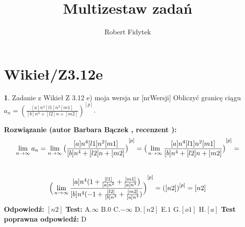 \documentclass[12pt, a4paper]{article}
\title{Multizestaw zadań}
\author{Robert Fidytek}
\date{}
\theoremstyle{definition} %
\newtheorem{zad}{}
\newcommand{\kategoria}[1]{\section{#1}} %
\newcommand{\zadStart}[1]{\begin{zad}#1\newline} %
\newcommand{\zadStop}{\end{zad}}   %
\newcommand{\rozwStart}[2]{\noindent \textbf{Rozwiązanie (autor #1 , recenzent #2): }\newline} %
\newcommand{\rozwStop}{\newline}                                            %
\newcommand{\odpStart}{\noindent \textbf{Odpowiedź:}\newline}    %
\newcommand{\odpStop}{\newline}                                             %
\newcommand{\testStart}{\noindent \textbf{Test:}\newline} %
\newcommand{\testStop}{\newline} %
\newcommand{\kluczStart}{\noindent \textbf{Test poprawna odpowiedź:}\newline} %
\newcommand{\kluczStop}{\newline} %
\begin{document}
\maketitle


\kategoria{Wikieł/Z3.12e}
\zadStart{Zadanie z Wikieł Z 3.12 e) moja wersja nr [nrWersji]}
Obliczyć granicę ciągu $a_n={(\frac{[a]n^4 [l1]n^2 [m1]}{[b]n^4 + [l2]n +[m2]})}^{[p]}$.
\zadStop
\rozwStart{Barbara Bączek}{}
$$\lim_{n \rightarrow \infty} a_n= \lim_{n \rightarrow \infty} {\big{(}\frac{[a]n^4 [l1]n^2 [m1]}{[b]n^4 + [l2]n +[m2]}\big{)}}^{[p]} = {\big{(}\lim_{n \rightarrow \infty} \frac{[a]n^4 [l1]n^2 [m1]}{[b]n^4 + [l2]n +[m2]}\big{)}}^{[p]}= $$\\ 
$${\Big{(}\lim_{n \rightarrow \infty} \frac{[a]n^4( 1 + \frac{[l1]}{[a]n^2} + \frac{[m1]}{[a]n^4}\big{)}}{[b]n^4 (-1 + \frac{[l2]}{[b]n^3} +\frac{[m2]}{[a]n^4})}\Big{)}}^{[p]}= {([n2])}^{[p]} =[n2]$$ 
\rozwStop
\odpStart
$[n2]$
\odpStop
\testStart
A.$\infty$
B.$0$
C.$-\infty$
D.$[n2]$
E.$1$
G.$[o1]$
H.$[a]$
\testStop
\kluczStart
D
\kluczStop
\end{document}
